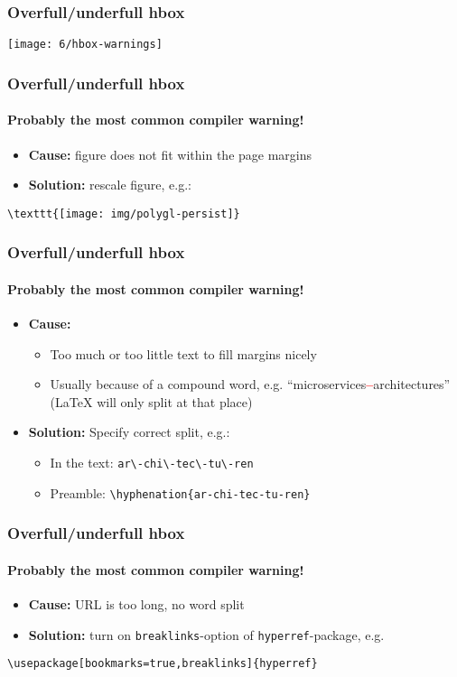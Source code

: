 \documentclass[aspectratio=169]{beamer}
\begin{document}
\begin{frame}
  \frametitle{Overfull/underfull hbox}

  \texttt{[image: 6/hbox-warnings]}

\end{frame}

\begin{frame}[fragile]
  \frametitle{Overfull/underfull hbox}
  \framesubtitle{Probably the most common compiler warning!}

  \begin{itemize}
    \item \textbf{Cause:} figure does not fit within the page margins
    \item \textbf{Solution:} rescale figure, e.g.:
  \end{itemize}

\begin{verbatim}
\texttt{[image: img/polygl-persist]}
\end{verbatim}

\end{frame}

\begin{frame}[fragile]
  \frametitle{Overfull/underfull hbox}
   \framesubtitle{Probably the most common compiler warning!}

  \begin{itemize}
   \item \textbf{Cause:}
   \begin{itemize}
       \item Too much or too little text to fill margins nicely
       \item Usually because of a compound word, e.g. ``microservices\textcolor{red}{\textbf{--}}architectures''
       ({\LaTeX} will only split at that place)
   \end{itemize}
   \item \textbf{Solution:} Specify correct split, e.g.:
   \begin{itemize}
       \item In the text: \verb|ar\-chi\-tec\-tu\-ren|
       \item Preamble: \verb|\hyphenation{ar-chi-tec-tu-ren}|
    \end{itemize}
  \end{itemize}

\end{frame}

\begin{frame}[fragile]
  \frametitle{Overfull/underfull hbox}
  \framesubtitle{Probably the most common compiler warning!}

  \begin{itemize}
    \item \textbf{Cause:} URL is too long, no word split
    \item \textbf{Solution:} turn on \texttt{breaklinks}-option of \texttt{hyperref}-package, e.g.
  \end{itemize}

\begin{verbatim}
\usepackage[bookmarks=true,breaklinks]{hyperref}
\end{verbatim}
\end{frame}
\end{document}
